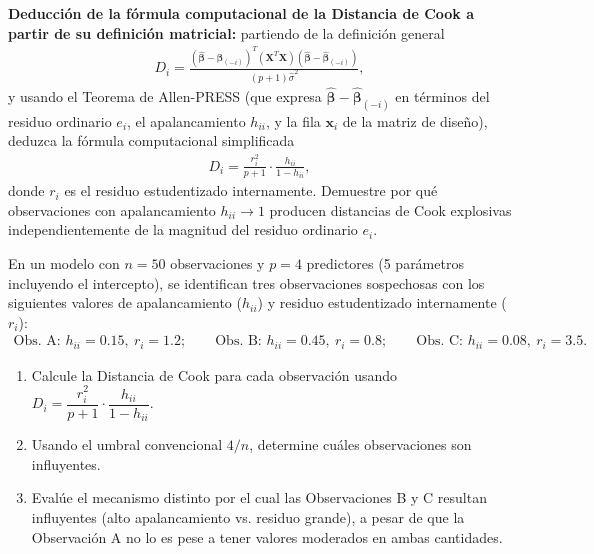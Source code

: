 \begin{problema}
	\label{prob:269eee0}
	\textbf{Deducción de la fórmula computacional de la Distancia de Cook a partir de su definición matricial:} partiendo de la definición general
	\begin{align}
		D_i = \frac{(\hat{\boldsymbol\beta}-\hat{\boldsymbol\beta}_{(-i)})^T (\mathbf{X}^T\mathbf{X}) (\hat{\boldsymbol\beta}-\hat{\boldsymbol\beta}_{(-i)})}{(p+1)\hat\sigma^2},
	\end{align}
	y usando el Teorema de Allen-PRESS (que expresa $\hat{\boldsymbol\beta}-\hat{\boldsymbol\beta}_{(-i)}$ en términos del residuo ordinario $e_i$, el apalancamiento $h_{ii}$, y la fila $\mathbf{x}_i$ de la matriz de diseño), deduzca la fórmula computacional simplificada
	\begin{align}
		D_i = \frac{r_i^2}{p+1}\cdot\frac{h_{ii}}{1-h_{ii}},
	\end{align}
	donde $r_i$ es el residuo estudentizado internamente. Demuestre por qué observaciones con apalancamiento $h_{ii}\to 1$ producen distancias de Cook explosivas independientemente de la magnitud del residuo ordinario $e_i$.
\end{problema}

\begin{problema}
	\label{prob:dc2ca7b}
	En un modelo con $n = 50$ observaciones y $p = 4$ predictores (5 parámetros incluyendo el intercepto), se identifican tres observaciones sospechosas con los siguientes valores de apalancamiento ($h_{ii}$) y residuo estudentizado internamente ($r_i$):
	\begin{align}
		\text{Obs. A: } h_{ii}=0.15,\ r_i=1.2; \qquad \text{Obs. B: } h_{ii}=0.45,\ r_i=0.8; \qquad \text{Obs. C: } h_{ii}=0.08,\ r_i=3.5.
	\end{align}
	\begin{enumerate}
		\item Calcule la Distancia de Cook para cada observación usando $D_i = \dfrac{r_i^2}{p+1}\cdot\dfrac{h_{ii}}{1-h_{ii}}$.
		\item Usando el umbral convencional $4/n$, determine cuáles observaciones son influyentes.
		\item Evalúe el mecanismo distinto por el cual las Observaciones B y C resultan influyentes (alto apalancamiento vs. residuo grande), a pesar de que la Observación A no lo es pese a tener valores moderados en ambas cantidades.
	\end{enumerate}
\end{problema}

